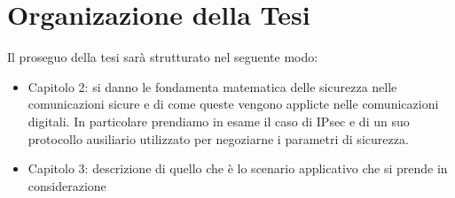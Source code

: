 \section*{Organizazione della Tesi}

Il proseguo della tesi sarà strutturato nel seguente modo:

\begin{itemize}
	\item Capitolo 2:  si danno le fondamenta matematica delle sicurezza nelle comunicazioni 
	sicure e di come queste vengono applicte nelle comunicazioni digitali. In particolare
	prendiamo in esame il caso di IPsec e di un suo protocollo ausiliario utilizzato per negoziarne 
	i parametri di sicurezza.
	\item Capitolo 3: descrizione di quello che è lo scenario applicativo che si prende in considerazione 
	
\end{itemize}


\newcommand{\keyword}[1]{\textbf{#1}}
\newcommand{\tabhead}[1]{\textbf{#1}}
\newcommand{\code}[1]{\texttt{#1}}
\newcommand{\file}[1]{\texttt{\bfseries#1}}
\newcommand{\option}[1]{\texttt{\itshape#1}}

